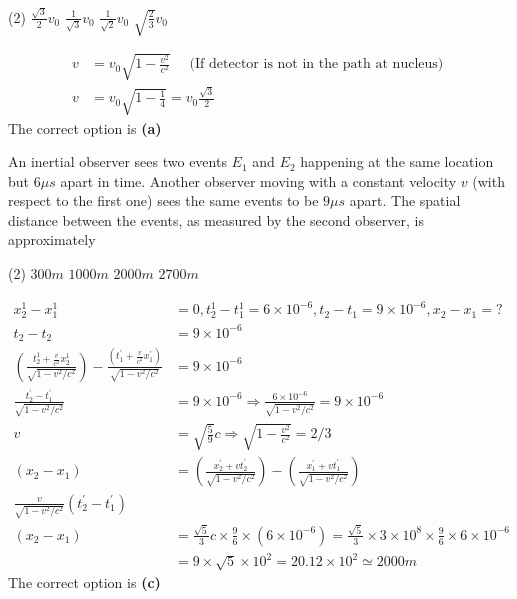 \begin{enumerate}
\begin{minipage}{\textwidth}
\end{minipage}
\begin{tasks}(2)
	\task[\textbf{A.}] $\frac{\sqrt{3}}{2} v_{0}$
	\task[\textbf{B.}]$\frac{1}{\sqrt{3}} v_{0}$
	\task[\textbf{C.}]$\frac{1}{\sqrt{2}} v_{0}$
	\task[\textbf{D.}]$\sqrt{\frac{2}{3}} v_{0}$
\end{tasks}
\begin{answer}
	\begin{align*}
	v&=v_{0} \sqrt{1-\frac{v^{2}}{c^{2}}} \quad \text { (If detector is not in the path at nucleus) }\\
	v&=v_{0} \sqrt{1-\frac{1}{4}}=v_{0} \frac{\sqrt{3}}{2}
	\end{align*}
	The correct option is \textbf{(a)}
\end{answer}
\begin{minipage}{\textwidth}
	\item An inertial observer sees two events $E_{1}$ and $E_{2}$ happening at the same location but $6 \mu s$ apart in time. Another observer moving with a constant velocity $v$ (with respect to the first one) sees the same events to be $9 \mu s$ apart. The spatial distance between the events, as measured by the second observer, is approximately
\end{minipage}
\begin{tasks}(2)
	\task[\textbf{A.}] $300 m$
	\task[\textbf{B.}]$1000 m$
	\task[\textbf{C.}]$2000 m$
	\task[\textbf{D.}]$2700 m$
\end{tasks}
\begin{answer}
\begin{align*}
	x_{2}^{1}-x_{1}^{1}&=0, t_{2}^{1}-t_{1}^{1}=6 \times 10^{-6}, t_{2}-t_{1}=9 \times 10^{-6}, x_{2}-x_{1}=?\\
t_{2}-t_{2}&=9 \times 10^{-6}\\
\left(\frac{t_{2}^{1}+\frac{v}{c^{2}} x_{2}^{1}}{\sqrt{1-v^{2} / c^{2}}}\right)-\frac{\left(t_{1}^{\prime}+\frac{v}{c^{2}} x_{1}^{\prime}\right)}{\sqrt{1-v^{2} / c^{2}}}&=9 \times 10^{-6}\\
\frac{t_{2}^{\prime}-t_{1}^{\prime}}{\sqrt{1-v^{2} / c^{2}}}&=9 \times 10^{-6} \Rightarrow \frac{6 \times 10^{-6}}{\sqrt{1-v^{2} / c^{2}}}=9 \times 10^{-6}\\
v&=\sqrt{\frac{5}{9}} c \Rightarrow \sqrt{1-\frac{v^{2}}{c^{2}}}=2 / 3\\
\left(x_{2}-x_{1}\right)&=\left(\frac{x_{2}^{\prime}+v t_{2}^{\prime}}{\sqrt{1-v^{2} / c^{2}}}\right)-\left(\frac{x_{1}^{\prime}+v t_{1}^{\prime}}{\sqrt{1-v^{2} / c^{2}}}\right)\\
\frac{v}{\sqrt{1-v^{2} / c^{2}}}\left(t_{2}^{\prime}-t_{1}^{\prime}\right)\\
\left(x_{2}-x_{1}\right)&=\frac{\sqrt{5}}{3} c \times \frac{9}{6} \times\left(6 \times 10^{-6}\right)=\frac{\sqrt{5}}{3} \times 3 \times 10^{8} \times \frac{9}{6} \times 6 \times 10^{-6}\\
&=9 \times \sqrt{5} \times 10^{2}=20.12 \times 10^{2} \simeq 2000 m
\end{align*}
The correct option is \textbf{(c)}
\end{answer}
\end{enumerate}